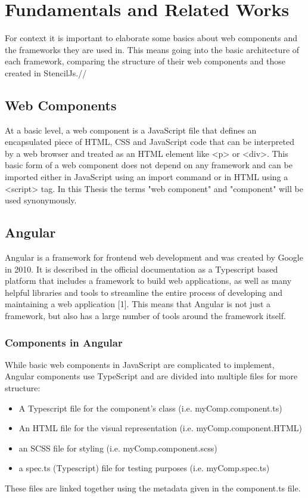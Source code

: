 \chapter{Fundamentals and Related Works}
\label{cha:fundamentals}
For context it is important to elaborate some basics about web components and the frameworks they are used in. This means going into the basic architecture of each framework, comparing the structure of their web components and those created in StencilJs.//

\section{Web Components}
At a basic level, a web component is a JavaScript file that defines an encapsulated piece of HTML, CSS and JavaScript code that can be interpreted by a web browser and treated as an HTML element like <p> or <div>. This basic form of a web component does not depend on any framework and can be imported either in JavaScript using an import command or in HTML using a <script> tag. In this Thesis the terms "web component" and "component" will be used synonymously.

\section{Angular}
Angular is a framework for frontend web development and was created by Google in 2010. It is described in the official documentation as a Typescript based platform that includes a framework to build web applications, as well as many helpful libraries and tools to streamline the entire process of developing and maintaining a web application [1]. This means that Angular is not just a framework, but also has a large number of tools around the framework itself.

\subsection{Components in Angular}
While basic web components in JavaScript are complicated to implement, Angular components use TypeScript and are divided into multiple files for more structure:

\begin{itemize}
\item A Typescript file for the component’s class (i.e. myComp.component.ts)
\item An HTML file for the visual representation (i.e. myComp.component.HTML)
\item an SCSS file for styling (i.e. myComp.component.scss)
\item a spec.ts (Typescript) file for testing purposes (i.e. myComp.spec.ts)
\end{itemize}
These files are linked together using the metadata given in the component.ts file.

